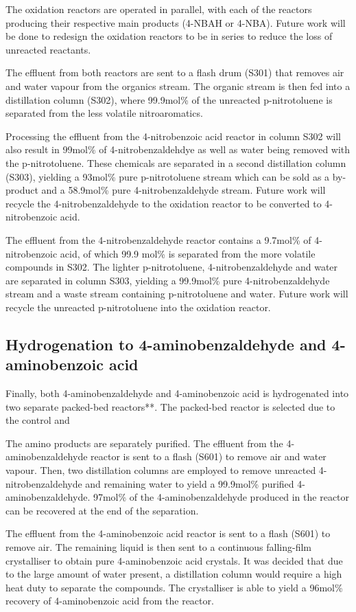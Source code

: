 The oxidation reactors are operated in parallel, with each of the reactors producing their respective main products (4-NBAH or 4-NBA). Future work will be done to redesign the oxidation reactors to be in series to reduce the loss of unreacted reactants.

The effluent from both reactors are sent to a flash drum (S301) that removes air and water vapour from the organics stream. The organic stream is then fed into a distillation column (S302), where 99.9mol\% of the unreacted p-nitrotoluene is separated from the less volatile nitroaromatics. 

Processing the effluent from the 4-nitrobenzoic acid reactor in column S302 will also result in 99mol\% of 4-nitrobenzaldehdye as well as water being removed with the p-nitrotoluene. These chemicals are separated in a second distillation column (S303), yielding a 93mol\% pure p-nitrotoluene stream which can be sold as a by-product and a 58.9mol\% pure 4-nitrobenzaldehyde stream. Future work will recycle the 4-nitrobenzaldehyde to the oxidation reactor to be converted to 4-nitrobenzoic acid.

The effluent from the 4-nitrobenzaldehyde reactor contains a 9.7mol\% of 4-nitrobenzoic acid, of which 99.9 mol\% is separated from the more volatile compounds in S302. The lighter p-nitrotoluene,  4-nitrobenzaldehyde and water are separated in column S303, yielding a 99.9mol\% pure 4-nitrobenzaldehyde stream and a waste stream containing p-nitrotoluene and water. Future work will recycle the unreacted p-nitrotoluene into the oxidation reactor.

\subsection{Hydrogenation to 4-aminobenzaldehyde and 4-aminobenzoic acid}

Finally, both 4-aminobenzaldehyde and 4-aminobenzoic acid is hydrogenated into two separate packed-bed reactors**. The packed-bed reactor is selected due to the control and

The amino products are separately purified. The effluent from the 4-aminobenzaldehyde reactor is sent to a flash (S601) to remove air and water vapour.  Then, two distillation columns are employed to remove unreacted 4-nitrobenzaldehyde and remaining water to yield a 99.9mol\% purified 4-aminobenzaldehyde. 97mol\% of the 4-aminobenzaldehyde produced in the reactor can be recovered at the end of the separation.

The effluent from the 4-aminobenzoic acid reactor is sent to a flash (S601) to remove air. The remaining liquid is then sent to a continuous falling-film crystalliser to obtain pure 4-aminobenzoic acid crystals. It was decided that due to the large amount of water present, a distillation column would require a high heat duty to separate the compounds. The crystalliser is able to yield a 96mol\% recovery of 4-aminobenzoic acid from the reactor.

